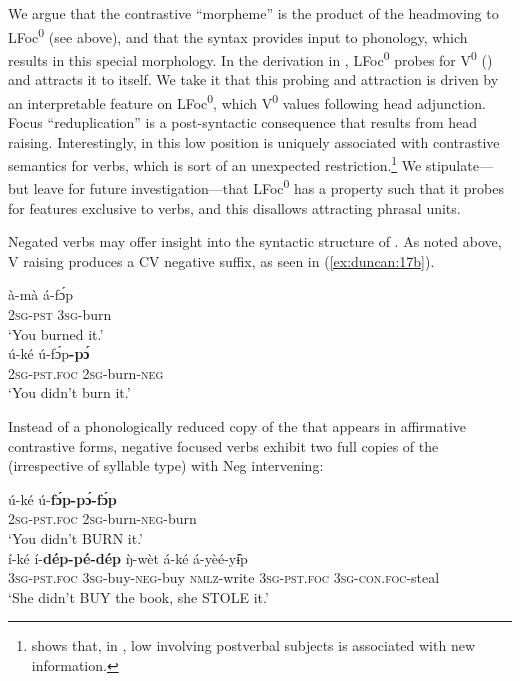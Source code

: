 \documentclass[output=paper,
modfonts
]{langscibook}
\begin{document}
\newpage
We argue that the contrastive   “morpheme” is the product of the  headmoving to LFoc\textsuperscript{0} (see  above), and that the syntax provides input to phonology, which results in this special  morphology. In the derivation in , LFoc\textsuperscript{0} probes for V\textsuperscript{0} (\citealt{Chomsky2000,Chomsky2001}) and attracts it to itself. We take it that this probing and attraction is driven by an interpretable  feature on LFoc\textsuperscript{0}, which V\textsuperscript{0} values following head adjunction. Focus “reduplication” is a post-syntactic consequence that results from head raising. Interestingly, in  this low  position is uniquely associated with contrastive semantics for verbs, which is sort of an unexpected restriction.\footnote{\citet{Belletti2004} shows that, in , low  involving postverbal subjects is associated with new information.} We stipulate—but leave for future investigation—that  LFoc\textsuperscript{0} has a property such that it probes for features exclusive to verbs, and this disallows attracting phrasal units.

Negated verbs may offer insight into the syntactic structure of  . As noted above, V raising produces a CV negative suffix, as seen in (\ref{ex:duncan:17b}).

\settowidth{}
\ea\label{ex:duncan:17}
  \ea 
  \gll à-mà á-f\'{ɔ}p\\
  2\textsc{sg-pst} 3\textsc{sg}-burn\\
  \glt ‘You burned it.’\\
  \ex\label{ex:duncan:17b}
  \gll ú-ké ú-f\'{ɔ}p\textbf{-p\'{ɔ}}\\
  2\textsc{sg-pst.foc} 2\textsc{sg}-burn-\textsc{neg}\\
  \glt ‘You didn’t burn it.’
  \z
\z

Instead of a phonologically reduced copy of the  that appears in affirmative contrastive   forms, negative focused verbs exhibit two full copies of the  (irrespective of syllable type) with Neg intervening:

\ea \label{ex:duncan:18} \settowidth{}
  \ea 
  \gll ú-ké ú-\textbf{f\'{ɔ}p-p\'{ɔ}-f\'{ɔ}p}\\
  2\textsc{sg}-\textsc{pst.foc} 2\textsc{sg}-burn\textsc{-neg}-burn\\
  \glt ‘You didn’t BURN it.’\\
  \ex
  \gll í-ké í-\textbf{dép-pé-dép} \`{ŋ}-wèt á-ké  á-yèé-y\^ɨp \\
  3\textsc{sg-pst.foc} \textsc{3sg}-buy-\textsc{neg}-buy \textsc{nmlz}-write 3\textsc{sg-pst.foc} \textsc{3sg-con.foc}-steal\\
  \glt ‘She didn’t BUY the book, she STOLE it.’
  \z
\z
\end{document}
